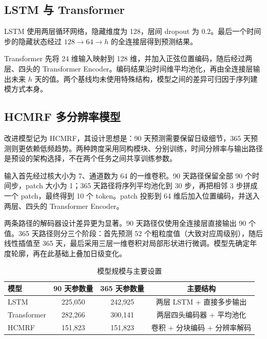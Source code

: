 \documentclass[11pt,a4paper]{article}
\begin{document}
\subsection{LSTM 与 Transformer}

LSTM 使用两层循环网络，隐藏维度为 128，层间 dropout 为 0.2。最后一个时间步的隐藏状态经过 $128\rightarrow64\rightarrow h$ 的全连接层得到预测结果。

Transformer 先将 24 维输入映射到 128 维，并加入正弦位置编码，随后经过两层、四头的 Transformer Encoder。编码结果沿时间维平均池化，再由全连接层输出未来 $h$ 天的值。两个基线均未使用特殊结构，模型之间的差异可归因于序列建模方式本身。

\subsection{HCMRF 多分辨率模型}

改进模型记为 HCMRF，其设计思想是：90 天预测需要保留日级细节，365 天预测则更依赖低频趋势。两种跨度采用同构模块、分别训练，时间分辨率与输出路径是预设的架构选择，不在两个任务之间共享训练参数。

输入首先经过核大小为 7、通道数为 64 的一维卷积。90 天路径保留全部 90 个时间步，patch 大小为 1；365 天路径将序列平均池化到 30 步，再把相邻 3 步拼成一个 patch，最终得到 10 个 token。patch 投影到 64 维后加入位置编码，并送入两层、四头的 Transformer Encoder。

两条路径的解码器设计差异更为显著。90 天路径仅使用全连接层直接输出 90 个值。365 天路径则分三个阶段：首先预测 52 个粗粒度值（大致对应周级别），随后线性插值至 365 天，最后采用三层一维卷积对局部形状进行微调。模型先确定年度轮廓，再在此基础上叠加日级变化。

\begin{center}
\end{center}

\begin{table}[H]
\centering
\caption{模型规模与主要设置}
\label{tab:params}
\begin{tabular}{lccc}
\toprule
模型 & 90 天参数量 & 365 天参数量 & 主要结构 \\
\midrule
LSTM & 225,050 & 242,925 & 两层 LSTM + 直接多步输出 \\
Transformer & 282,266 & 300,141 & 两层四头编码器 + 平均池化 \\
HCMRF & 151,823 & 151,823 & 卷积 + 分块编码 + 分辨率解码 \\
\bottomrule
\end{tabular}
\end{table}
\end{document}
